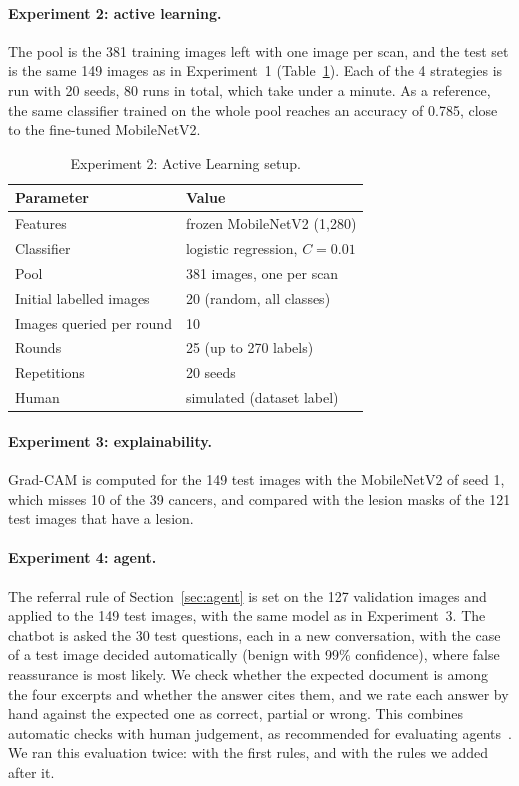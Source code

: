 \documentclass{article}
\begin{document}
\paragraph{Experiment 2: active learning.} The pool is the 381 training images left with one
image per scan, and the test set is the same 149 images as in Experiment~1
(Table~\ref{tab:params}). Each of the 4 strategies is run with 20 seeds, 80 runs in total,
which take under a minute. As a reference, the same classifier trained on the whole pool
reaches an accuracy of 0.785, close to the fine-tuned MobileNetV2.

\begin{table}[t]
\centering
\small
\begin{tabular}{ll}
\toprule
Parameter & Value \\
\midrule
Features & frozen MobileNetV2 (1{,}280) \\
Classifier & logistic regression, $C=0.01$ \\
Pool & 381 images, one per scan \\
Initial labelled images & 20 (random, all classes) \\
Images queried per round & 10 \\
Rounds & 25 (up to 270 labels) \\
Repetitions & 20 seeds \\
Human & simulated (dataset label) \\
\bottomrule
\end{tabular}
\caption{Experiment 2: Active Learning setup.}
\label{tab:params}
\end{table}

\paragraph{Experiment 3: explainability.} Grad-CAM is computed for the 149 test images with
the MobileNetV2 of seed 1, which misses 10 of the 39 cancers, and compared with the lesion
masks of the 121 test images that have a lesion.

\paragraph{Experiment 4: agent.} The referral rule of Section~\ref{sec:agent} is set on the
127 validation images and applied to the 149 test images, with the same model as in
Experiment~3. The chatbot is asked the 30 test questions, each in a new conversation, with
the case of a test image decided automatically (benign with 99\% confidence), where false
reassurance is most likely. We check whether the expected document is among the four
excerpts and whether the answer cites them, and we rate each answer by hand against the
expected one as correct, partial or wrong. This combines automatic checks with human
judgement, as recommended for evaluating agents~\cite{grace2026evals}. We ran this evaluation
twice: with the first rules, and with the rules we added after it.
\end{document}
